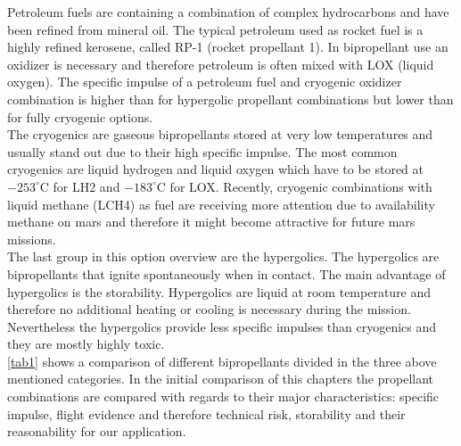 Petroleum fuels are containing a combination of complex hydrocarbons and have been refined from mineral oil. The typical petroleum used as rocket fuel is a highly refined kerosene, called RP-1 (rocket propellant 1). In bipropellant use an oxidizer is necessary and therefore petroleum is often mixed with LOX (liquid oxygen). The specific impulse of a petroleum fuel and cryogenic oxidizer combination is higher than for hypergolic propellant combinations but lower than for fully cryogenic options. \\

The cryogenics are gaseous bipropellants stored at very low temperatures and usually stand out due to their high specific impulse. The most common cryogenics are liquid hydrogen and liquid oxygen which have to be stored at $-253^\circ$C for LH2 and $-183^\circ$C for LOX. Recently, cryogenic combinations with liquid methane (LCH4) as fuel are receiving more attention due to availability methane on mars and therefore it might become attractive for future mars missions.\\

The last group in this option overview are the hypergolics. The hypergolics are bipropellants that ignite spontaneously when in contact. The main advantage of hypergolics is the storability. Hypergolics are liquid at room temperature and therefore no additional heating or cooling is necessary during the mission. Nevertheless the hypergolics provide less specific impulses than cryogenics and they are mostly highly toxic.\\

\autoref{tab1} shows a comparison of different bipropellants divided in the three above mentioned categories. In the initial comparison of this chapters the propellant combinations are compared with regards to their major characteristics: specific impulse, flight evidence and therefore technical risk, storability and their reasonability for our application. \\

